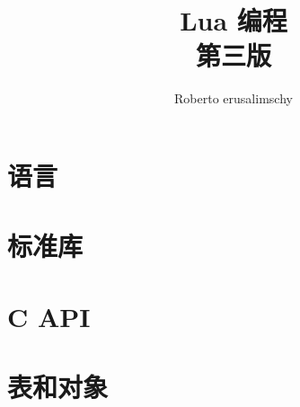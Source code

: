 \documentclass[UTF8]{ctexbook}
\begin{document}
    \title{Lua 编程\\第三版}
    \author{Roberto erusalimschy}
    \maketitle
    \tableofcontents
    \frontmatter
    
    \mainmatter
    \part{语言}
    
    
    \part{标准库}
    \part{C API}
    \part{表和对象}
    \appendix
    \backmatter
    
\end{document}
